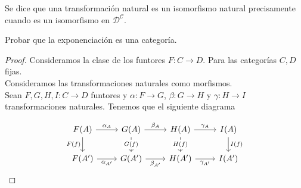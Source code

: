     \begin{definition}
        Se dice que una transformación natural es un isomorfismo natural precisamente cuando es un isomorfismo en $\mathcal{D^C}$.
    \end{definition}
    \begin{lemma}%
    Probar que la exponenciación es una categoría.
\end{lemma}
\begin{proof}
  Consideramos la clase de los funtores $F\colon C\to D$. Para las categorías $C,D$ fijas.\\
Consideramos las transformaciones naturales como morfismos.\\
Sean $F,G,H,I:C\to D$ funtores y $\alpha\colon F\to G$, $\beta\colon G\to H$ y $\gamma\colon H\to I$ transformaciones naturales. Tenemos que el siguiente diagrama

\[
\begin{tikzcd}
F(A) \arrow[d, "F(f)"'] \arrow[r, "\alpha_A"] & G(A) \arrow[d, "G(f)" description] \arrow[r, "\beta_A"] & H(A) \arrow[d, "H(f)" description] \arrow[r, "\gamma_A"] & I(A) \arrow[d, "I(f)"] \\
F(A') \arrow[r, "\alpha_{A'}"']               & G(A') \arrow[r, "\beta_{A'}"']                          & H(A') \arrow[r, "\gamma_{A'}"']                          & I(A')                 
\end{tikzcd}
\]


\end{proof}
